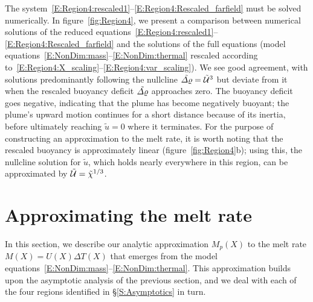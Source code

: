 \documentclass[openacc]{rsproca_new}%
\begin{document}
The system~\eqref{E:Region4:rescaled1}--\eqref{E:Region4:Rescaled_farfield} must be solved numerically. In figure~\ref{fig:Region4}, we present a comparison between numerical solutions of the reduced equations~\eqref{E:Region4:rescaled1}--\eqref{E:Region4:Rescaled_farfield} and the solutions of the full equations (model equations~\eqref{E:NonDim:mass}--\eqref{E:NonDim:thermal} rescaled according to~\eqref{E:Region4:X_scaling}--\eqref{E:Region4:var_scaling}). We see good agreement, with solutions predominantly following the nullcline $\tilde{\varDelta \varrho} = \tilde{\mathcal{U}}^3$ but deviate from it when the rescaled buoyancy deficit $\tilde{\varDelta \varrho}$ approaches zero. The buoyancy deficit goes negative, indicating that the plume has become negatively buoyant; the plume's upward motion continues for a short distance because of its inertia, before ultimately reaching $\tilde{u} = 0$ where it terminates. For the purpose of constructing an approximation to the melt rate, it is worth noting that the rescaled buoyancy is approximately linear (figure~\ref{fig:Region4}b); using this, the nullcline solution for $\tilde{u}$, which holds nearly everywhere in this region, can be approximated by $\tilde{\mathcal{U}} = \tilde{\chi}^{1/3}$.


\section{Approximating the melt rate}\label{S:MeltRate}
In this section, we describe our analytic approximation $M_p(X)$ to the melt rate $M(X) = U(X)\Delta T(X)$ that emerges from the model equations~\eqref{E:NonDim:mass}--\eqref{E:NonDim:thermal}. This approximation builds upon the asymptotic analysis of the previous section, and we deal with each of the four regions identified in \S\ref{S:Asymptotics} in turn.
\end{document}
